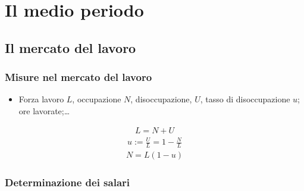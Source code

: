 \documentclass[letterpaper,10pt,italian]{jupyterBook}
\begin{document}
\section{Il medio periodo}
\label{\detokenize{ch/macro:il-medio-periodo}}\label{\detokenize{ch/macro:economics-hs-macro-medium-run}}

\subsection{Il mercato del lavoro}
\label{\detokenize{ch/macro:il-mercato-del-lavoro}}\label{\detokenize{ch/macro:economics-hs-macro-medium-run-jobs-market}}\label{\detokenize{ch/macro:economics-hs-macro-medium-run-jobs-market-stats}}\subsubsection*{Misure nel mercato del lavoro}
\begin{itemize}
\item {} 
\sphinxAtStartPar
Forza lavoro \(L\), occupazione \(N\), disoccupazione, \(U\), tasso di disoccupazione \(u\); ore lavorate;…

\end{itemize}
\begin{equation*}
\begin{split}L = N + U\end{split}
\end{equation*}\begin{equation*}
\begin{split}u := \frac{U}{L} = 1 - \frac{N}{L}\end{split}
\end{equation*}\begin{equation*}
\begin{split}N = L (1 - u)\end{split}
\end{equation*}\label{\detokenize{ch/macro:economics-hs-macro-medium-run-jobs-market-wages}}\subsubsection*{Determinazione dei salari}
\end{document}
